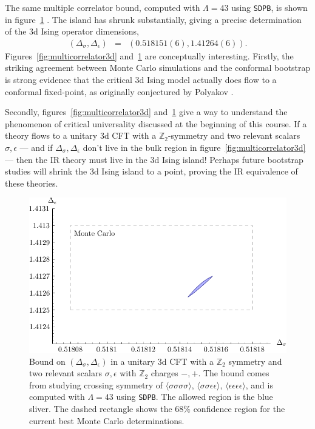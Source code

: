 \documentclass{ws-rv9x6}
\newcommand\be{\begin{eqnarray}}
\newcommand\ee{\end{eqnarray}}
\newcommand\e\epsilon
\newcommand\<\langle
\renewcommand\>\rangle
\newcommand\Z{\mathbb{Z}}
\renewcommand\.{\cdot}
\newcommand\s\sigma
\newcommand\De{\Delta}
\begin{document}
The same multiple correlator bound, computed with $\Lambda=43$ using {\tt SDPB}, is shown in figure~\ref{fig:sdpbBound} \cite{Simmons-Duffin:2015qma}.  The island has shrunk substantially, giving a precise determination of the 3d Ising operator dimensions,
\be
(\De_\s,\De_\e) &=& (0.518151(6), 1.41264(6)).
\ee
Figures~\ref{fig:multicorrelator3d} and~\ref{fig:sdpbBound} are conceptually interesting.  Firstly, the striking agreement between Monte Carlo simulations and the conformal bootstrap is strong evidence that the critical 3d Ising model actually does flow to a conformal fixed-point, as originally conjectured by Polyakov \cite{Polyakov:1970xd}.

Secondly, figures~\ref{fig:multicorrelator3d} and~\ref{fig:sdpbBound} give a way to understand the phenomenon of critical universality discussed at the beginning of this course.  If a theory flows to a unitary 3d CFT with a $\Z_2$-symmetry and two relevant scalars $\s,\e$ --- and if $\De_\s,\De_\e$ don't live in the bulk region in figure~\ref{fig:multicorrelator3d} --- then the IR theory must live in the 3d Ising island!  Perhaps future bootstrap studies will shrink the 3d Ising island to a point, proving the IR equivalence of these theories.

\begin{figure}[hrt!]
\begin{center}
\includegraphics[width=\textwidth]{sdpbBound}
\end{center}
\caption{\label{fig:sdpbBound} Bound on $(\De_\s,\De_\e)$ in a unitary 3d CFT with a $\Z_2$ symmetry and two relevant scalars $\s,\e$ with $\Z_2$ charges $-,+$.  The bound comes from studying crossing symmetry of $\<\s\s\s\s\>$, $\<\s\s\e\e\>$, $\<\e\e\e\e\>$, and is computed with $\Lambda=43$ using {\tt SDPB}. The allowed region is the blue sliver. The dashed rectangle shows the $68\%$ confidence region for the current best Monte Carlo determinations.}
\end{figure}
\end{document}
